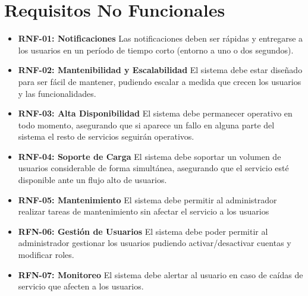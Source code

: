 \section{Requisitos No Funcionales}
\begin{itemize}
    \item \textbf{RNF-01: Notificaciones}  
    Las notificaciones deben ser rápidas y entregarse a los usuarios en un período de tiempo corto (entorno a uno o dos segundos).
    
    \item \textbf{RNF-02: Mantenibilidad y Escalabilidad}  
    El sistema debe estar diseñado para ser fácil de mantener, pudiendo escalar a medida que crecen los usuarios y las funcionalidades.
    
    \item \textbf{RNF-03: Alta Disponibilidad}  
    El sistema debe permanecer operativo en todo momento, asegurando que si aparece un fallo en alguna parte del sistema el resto de servicios seguirán operativos.
    
    \item \textbf{RNF-04: Soporte de Carga}  
    El sistema debe soportar un volumen de usuarios considerable de forma simultánea, asegurando que el servicio esté disponible ante un flujo alto de usuarios.

    \item \textbf{RNF-05: Mantenimiento}
    El sistema debe permitir al administrador realizar tareas de mantenimiento sin afectar el servicio a los usuarios
    \item \textbf{RFN-06: Gestión de Usuarios}
    El sistema debe poder permitir al administrador gestionar los usuarios pudiendo activar/desactivar cuentas y modificar roles.
    \item \textbf{RFN-07: Monitoreo}
    El sistema debe alertar al usuario en caso de caídas de servicio que afecten a los usuarios.
\end{itemize}

